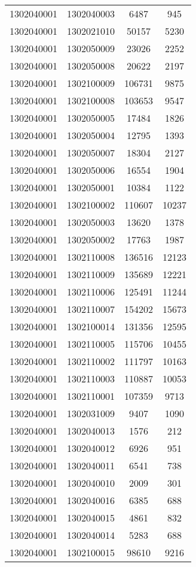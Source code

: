 \begin{longtable}[h]{llcc}
		1302040001 & 1302040003 & 6487 & 945\\
		1302040001 & 1302021010 & 50157 & 5230\\
		1302040001 & 1302050009 & 23026 & 2252\\
		1302040001 & 1302050008 & 20622 & 2197\\
		1302040001 & 1302100009 & 106731 & 9875\\
		1302040001 & 1302100008 & 103653 & 9547\\
		1302040001 & 1302050005 & 17484 & 1826\\
		1302040001 & 1302050004 & 12795 & 1393\\
		1302040001 & 1302050007 & 18304 & 2127\\
		1302040001 & 1302050006 & 16554 & 1904\\
		1302040001 & 1302050001 & 10384 & 1122\\
		1302040001 & 1302100002 & 110607 & 10237\\
		1302040001 & 1302050003 & 13620 & 1378\\
		1302040001 & 1302050002 & 17763 & 1987\\
		1302040001 & 1302110008 & 136516 & 12123\\
		1302040001 & 1302110009 & 135689 & 12221\\
		1302040001 & 1302110006 & 125491 & 11244\\
		1302040001 & 1302110007 & 154202 & 15673\\
		1302040001 & 1302100014 & 131356 & 12595\\
		1302040001 & 1302110005 & 115706 & 10455\\
		1302040001 & 1302110002 & 111797 & 10163\\
		1302040001 & 1302110003 & 110887 & 10053\\
		1302040001 & 1302110001 & 107359 & 9713\\
		1302040001 & 1302031009 & 9407 & 1090\\
		1302040001 & 1302040013 & 1576 & 212\\
		1302040001 & 1302040012 & 6926 & 951\\
		1302040001 & 1302040011 & 6541 & 738\\
		1302040001 & 1302040010 & 2009 & 301\\
		1302040001 & 1302040016 & 6385 & 688\\
		1302040001 & 1302040015 & 4861 & 832\\
		1302040001 & 1302040014 & 5283 & 688\\
		1302040001 & 1302100015 & 98610 & 9216\\

\end{longtable}
